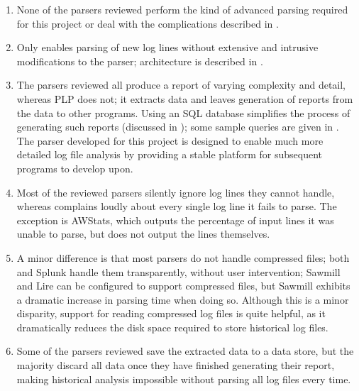\begin{enumerate}

    \item None of the parsers reviewed perform the kind of advanced parsing
        required for this project or deal with the complications described
        in .

    \item Only \parsername{} enables parsing of new log lines without
        extensive and intrusive modifications to the parser; \parsernames{}
        architecture is described in .

    \item The parsers reviewed all produce a report of varying complexity
        and detail, whereas \gls{PLP} does not; it extracts data and leaves
        generation of reports from the data to other programs.  Using an
        \gls{SQL} database simplifies the process of generating such
        reports (discussed in ); some sample
        queries are given in .  The parser developed
        for this project is designed to enable much more detailed log file
        analysis by providing a stable platform for subsequent programs to
        develop upon.

    \item Most of the reviewed parsers silently ignore log lines they
        cannot handle, whereas \parsername{} complains loudly about every
        single log line it fails to parse.  The exception is AWStats, which
        outputs the percentage of input lines it was unable to parse, but
        does not output the lines themselves.

    \item A minor difference is that most parsers do not handle compressed
        files; both \parsername{} and Splunk handle them transparently,
        without user intervention; Sawmill and Lire can be configured to
        support compressed files, but Sawmill exhibits a dramatic increase
        in parsing time when doing so.  Although this is a minor
        disparity, support for reading compressed log files is quite
        helpful, as it dramatically reduces the disk space required to
        store historical log files.

    \item Some of the parsers reviewed save the extracted data to a data
        store, but the majority discard all data once they have finished
        generating their report, making historical analysis impossible
        without parsing all log files every time.

\end{enumerate}

